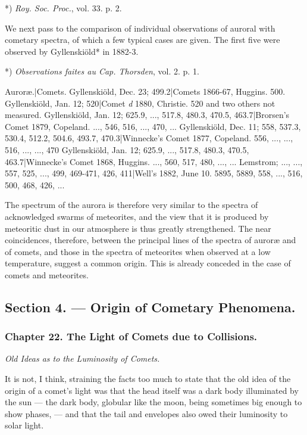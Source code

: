 \documentclass[a4paper, 12pt, oneside, polutonikogreek, english]{article}
\begin{document}
*) \emph{Roy. Soc. Proc.}, vol. 33. p. 2.

We next pass to the comparison of individual observations of auroral with cometary spectra, of which a few typical cases are given. The first five were observed by Gyllenskiöld* in 1882-3.

*) \emph{Observations faites au Cap. Thorsden}, vol. 2. p. 1.

Auroræ.|Comets. 
Gyllenskiöld, Dec. 23; 499.2|Comets 1866-67, Huggins. 500. 
Gyllenskiöld, Jan. 12; 520|Comet \emph{d} 1880, Christie. 520 and two others not measured. 
Gyllenskiöld, Jan. 12; 625.9, ..., 517.8, 480.3, 470.5, 463.7|Brorsen's Comet 1879, Copeland. ..., 546, 516, ..., 470, ... 
Gyllenskiöld, Dec. 11; 558, 537.3, 530.4, 512.2, 504.6, 493.7, 470.3|Winnecke's Comet 1877, Copeland. 556, ..., ..., 516, ..., ..., 470 
Gyllenskiöld, Jan. 12; 625.9, ..., 517.8, 480.3, 470.5, 463.7|Winnecke's Comet 1868, Huggins. ..., 560, 517, 480, ..., ... 
Lemstrom; ..., ..., 557, 525, ..., 499, 469-471, 426, 411|Well's 1882, June 10. 5895, 5889, 558, ..., 516, 500, 468, 426, ...

The spectrum of the aurora is therefore very similar to the spectra of acknowledged swarms of meteorites, and the view that it is produced by meteoritic dust in our atmosphere is thus greatly strengthened. The near coincidences, therefore, between the principal lines of the spectra of auroræ and of comets, and those in the spectra of meteorites when observed at a low temperature, suggest a common origin. This is already conceded in the case of comets and meteorites.

\subsection{Section 4. --- Origin of Cometary Phenomena.}

\subsubsection{Chapter 22. The Light of Comets due to Collisions.}

\emph{Old Ideas as to the Luminosity of Comets.}

It is not, I think, straining the facts too much to state that the old idea of the origin of a comet's light was that the head itself was a dark body illuminated by the sun --- the dark body, globular like the moon, being sometimes big enough to show phases, --- and that the tail and envelopes also owed their luminosity to solar light.
\end{document}
